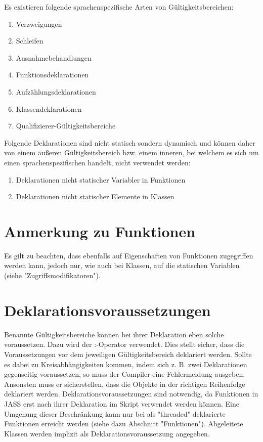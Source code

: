 Es existieren folgende sprachenspezifische Arten von Gültigkeitsbereichen:
\begin{enumerate}
\item Verzweigungen
\item Schleifen
\item Ausnahmebehandlungen
\item Funktionsdeklarationen
\item Aufzählungsdeklarationen
\item Klassendeklarationen
\item Qualifizierer-Gültigkeitsbereiche
\end{enumerate}

Folgende Deklarationen sind nicht statisch sondern dynamisch und können daher von einem äußeren Gültigkeitsbereich bzw. einem inneren, bei welchem es sich um einen
sprachenspezifischen handelt, nicht verwendet werden:
\begin{enumerate}
\item Deklarationen nicht statischer Variabler in Funktionen
\item Deklarationen nicht statischer Elemente in Klassen
\end{enumerate}

\section{Anmerkung zu Funktionen}
Es gilt zu beachten, dass ebenfalls auf Eigenschaften von Funktionen zugegriffen werden kann, jedoch nur, wie auch bei Klassen,
auf die statischen Variablen (siehe "Zugriffsmodifikatoren").

\section{Deklarationsvoraussetzungen}
Benannte Gültigkeitsbereiche können bei ihrer Deklaration eben solche voraussetzen.
Dazu wird der :-Operator verwendet. Dies stellt sicher, dass die Voraussetzungen vor dem jeweiligen
Gültigkeitsbereich deklariert werden. Sollte es dabei zu Kreisabhängigkeiten kommen, indem sich z. B. zwei
Deklarationen gegenseitig voraussetzen, so muss der Compiler eine Fehlermeldung ausgeben.
Ansonsten muss er sicherstellen, dass die Objekte in der richtigen Reihenfolge deklariert werden.
Deklarationsvoraussetzungen sind notwendig, da Funktionen in JASS erst nach ihrer Deklaration im Skript
verwendet werden können.
Eine Umgehung dieser Beschränkung kann nur bei als "threaded" deklarierte Funktionen erreicht werden
(siehe dazu Abschnitt "Funktionen").
Abgeleitete Klassen werden implizit als Deklarationsvoraussetzung angegeben.

